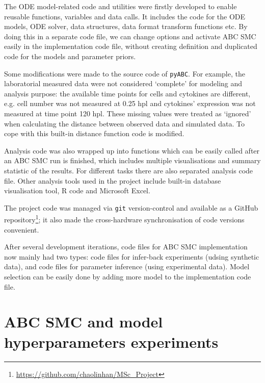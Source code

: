 The ODE model-related code and utilities were firstly developed to enable reusable functions, variables and data calls. It includes the code for the ODE models, ODE solver, data structures, data format transform functions etc. By doing this in a separate code file, we can change options and activate ABC SMC easily in the implementation code file, without creating definition and duplicated code for the models and parameter priors.

Some modifications were made to the source code of \verb|pyABC|. For example, the laboratorial measured data were not considered `complete' for modeling and analysis purpose: the available time points for cells and cytokines are different, e.g. cell number was not measured at 0.25 hpl and cytokines' expression was not measured at time point 120 hpl. These missing values were treated as `ignored' when calculating the distance between observed data and simulated data. To cope with this built-in distance function code is modified.

Analysis code was also wrapped up into functions which can be easily called after an ABC SMC run is finished, which includes multiple visualisations and summary statistic of the results. For different tasks there are also separated analysis code file. Other analysis tools used in the project include built-in database visualisation tool, R code and Microsoft Excel.

The project code was managed via \verb|git| version-control and available as a GitHub repository\footnote{\url{https://github.com/chaolinhan/MSc_Project}}; it also made the cross-hardware synchronisation of code versions convenient.

After several development iterations, code files for ABC SMC implementation now mainly had two types: code files for infer-back experiments (udsing synthetic data), and code files for parameter inference (using experimental data). Model selection can be easily done by adding more model to the implementation code file.










\section{ABC SMC and model hyperparameters experiments}

